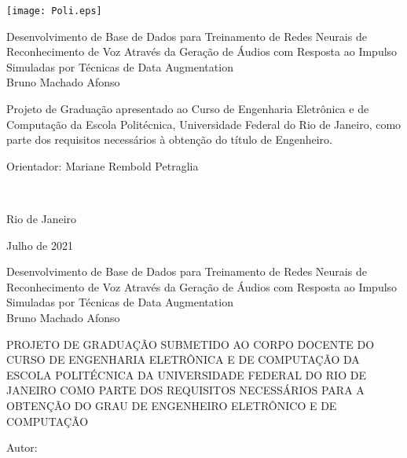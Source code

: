 \texttt{[image: Poli.eps]}

\begin{center}
\large{Desenvolvimento de Base de Dados para Treinamento de Redes Neurais de Reconhecimento de Voz Através da Geração de Áudios com Resposta
ao Impulso Simuladas por Técnicas de Data Augmentation}\\
   \vspace{2cm}
\large{Bruno Machado Afonso}\\
\end{center}
   \vspace{3cm}
\hspace{7cm}
\hfill \parbox{8.0cm}{Projeto de Graduação apresentado ao Curso de Engenharia Eletrônica e de Computação da Escola Politécnica,
Universidade Federal do Rio de Janeiro, como parte dos requisitos necessários à obtenção do título de Engenheiro.\\}
   \vspace{1cm}
\hfill \parbox{8.0cm}{Orientador: Mariane Rembold Petraglia} \\
   \vspace{1cm}
\begin{center}
Rio de Janeiro

Julho de 2021
\end{center}

\pagebreak


\begin{center}
\large{Desenvolvimento de Base de Dados para Treinamento de Redes Neurais de Reconhecimento de Voz Através da Geração de Áudios com Resposta
ao Impulso Simuladas por Técnicas de Data Augmentation}\\
   \vspace{1cm}
\large{Bruno Machado Afonso}\\
\end{center}
   \vspace{2cm}
PROJETO DE GRADUAÇÃO SUBMETIDO AO CORPO DOCENTE DO CURSO DE ENGENHARIA ELETRÔNICA E DE COMPUTAÇÃO DA ESCOLA POLITÉCNICA DA
UNIVERSIDADE FEDERAL DO RIO DE JANEIRO COMO PARTE DOS REQUISITOS NECESSÁRIOS PARA A OBTENÇÃO DO GRAU DE ENGENHEIRO ELETRÔNICO E DE COMPUTAÇÃO   
   
   \vspace{1cm}
Autor:
      \vspace{0.5cm}
      \begin{flushright}
         \parbox{10cm}{
            \hrulefill

            \vspace{-.375cm}

            \vspace{0.1cm}
         }
      \end{flushright}
      
